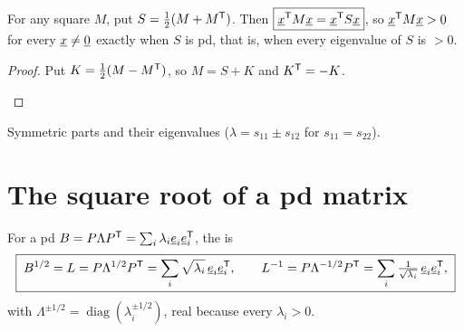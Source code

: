 \begin{result}
For any square $M$, put $S=\tfrac12(M+M^{\mathsf{T}})$. Then $\boxed{\underline{x}^{\mathsf{T}} M\underline{x}=\underline{x}^{\mathsf{T}} S\underline{x}}$, so $\underline{x}^{\mathsf{T}} M\underline{x}>0$ for every $\underline{x}\ne\underline{0}$ exactly when $S$ is pd, that is, when every eigenvalue of $S$ is $>0$.
\end{result}
\begin{proof}
Put $K=\tfrac12(M-M^{\mathsf{T}})$, so $M=S+K$ and $K^{\mathsf{T}}=-K$.
\begin{deriv}
\end{deriv}
\end{proof}

\begin{example}
Symmetric parts and their eigenvalues ($\lambda=s_{11}\pm s_{12}$ for $s_{11}=s_{22}$).
\begin{deriv}
\end{deriv}
\end{example}

\section{The square root of a pd matrix}

\begin{definition}
For a pd $B=P\Lambda P^{\mathsf{T}}=\sum_i\lambda_i\underline{e}_i\underline{e}_i^{\mathsf{T}}$, the  is
\[
  \boxed{\;B^{1/2}=L=P\Lambda^{1/2}P^{\mathsf{T}}=\sum_i\sqrt{\lambda_i}\,\underline{e}_i\underline{e}_i^{\mathsf{T}},\qquad L^{-1}=P\Lambda^{-1/2}P^{\mathsf{T}}=\sum_i\tfrac1{\sqrt{\lambda_i}}\,\underline{e}_i\underline{e}_i^{\mathsf{T}},\;}
\]
with $\Lambda^{\pm1/2}=\operatorname{diag}(\lambda_i^{\pm1/2})$, real because every $\lambda_i>0$.
\end{definition}

